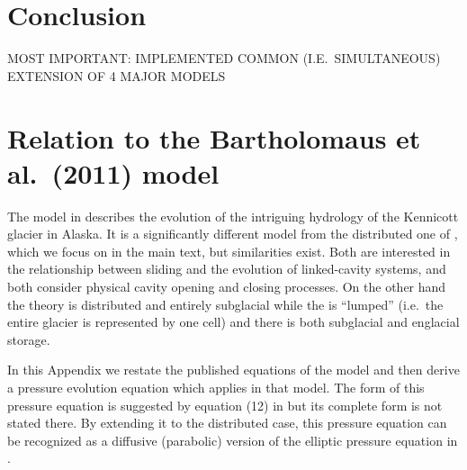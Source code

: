 \documentclass[11pt,final]{amsart}
\begin{document}
\section{Conclusion}  \label{sec:conclusion}

MOST IMPORTANT:  IMPLEMENTED COMMON (I.E.~SIMULTANEOUS) EXTENSION OF 4 MAJOR MODELS


\small

\normalsize


\appendix
\small

\section{Relation to the Bartholomaus et al.~(2011) model}  \label{app:barth}

The model in \cite{Bartholomausetal2011} describes the evolution of the intriguing hydrology of the Kennicott glacier in Alaska.  It is a significantly different model from the distributed one of \cite{Schoofetal2012}, which we focus on in the main text, but similarities exist.  Both are interested in the relationship between sliding and the evolution of linked-cavity systems, and both consider physical cavity opening and closing processes.  On the other hand the \cite{Schoofetal2012} theory is distributed and entirely subglacial while the \cite{Bartholomausetal2011} is ``lumped'' (i.e.~the entire glacier is represented by one cell) and there is both subglacial and englacial storage.

In this Appendix we restate the published equations of the \cite{Bartholomausetal2011} model and then derive a pressure evolution equation which applies in that model.  The form of this pressure equation is suggested by equation (12) in \cite{Bartholomausetal2011} but its complete form is not stated there.  By extending it to the distributed case, this pressure equation can be recognized as a diffusive (parabolic) version of the elliptic pressure equation in \cite{Schoofetal2012}.
\end{document}
